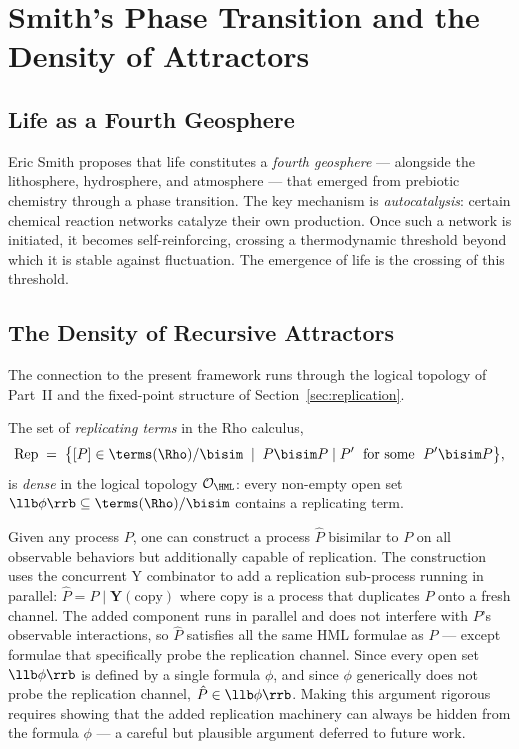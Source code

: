 \chapter{Smith's Phase Transition and the Density of Attractors}
\label{sec:phase}

\section{Life as a Fourth Geosphere}

Eric Smith proposes that life constitutes a \emph{fourth geosphere}
--- alongside the lithosphere, hydrosphere, and atmosphere ---
that emerged from prebiotic chemistry through a phase transition.
The key mechanism is \emph{autocatalysis}: certain chemical reaction
networks catalyze their own production.
Once such a network is initiated, it becomes self-reinforcing,
crossing a thermodynamic threshold beyond which it is stable against
fluctuation.
The emergence of life is the crossing of this threshold.

\section{The Density of Recursive Attractors}

The connection to the present framework runs through the logical
topology of Part~II and the fixed-point structure of
Section~\ref{sec:replication}.

\begin{conjecture}
\label{conj:density}
The set of \emph{replicating terms} in the Rho calculus,
\[
  \mathrm{Rep} \;=\;
  \bigl\{ [P] \in \terms(\Rho)/{\bisim} \;\mid\;
    P \bisim P \mid P' \;\text{ for some }\; P' \bisim P \bigr\},
\]
is \emph{dense} in the logical topology $\mathcal{O}_{\HML}$:
every non-empty open set $\llb\phi\rrb \subseteq \terms(\Rho)/{\bisim}$
contains a replicating term.
\end{conjecture}

\begin{remark}
Given any process $P$, one can construct a process $\hat{P}$
bisimilar to $P$ on all observable behaviors but additionally
capable of replication.
The construction uses the concurrent Y combinator to add
a replication sub-process running in parallel: 
$\hat{P} = P \mid \mathbf{Y}(\mathrm{copy})$
where $\mathrm{copy}$ is a process that duplicates $P$ onto a
fresh channel.
The added component runs in parallel and does not interfere with
$P$'s observable interactions, so $\hat{P}$ satisfies all the
same HML formulae as $P$ --- except formulae that specifically
probe the replication channel.
Since every open set $\llb\phi\rrb$ is defined by a single formula
$\phi$, and since $\phi$ generically does not probe the replication
channel, $\hat{P} \in \llb\phi\rrb$.
Making this argument rigorous requires showing that the added
replication machinery can always be hidden from the formula $\phi$
--- a careful but plausible argument deferred to future work.
\end{remark}


